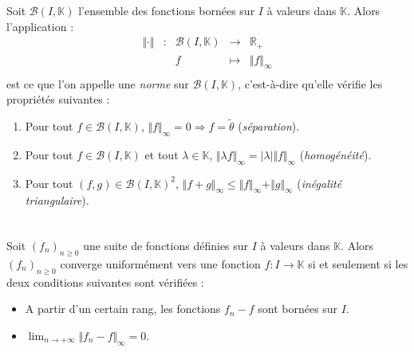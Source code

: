 \documentclass[a4paper,10pt]{report}
\begin{document}
\begin{Theoreme}{} Soit $\mathcal{B}(I,\mathbb{K})$ l'ensemble des fonctions bornées sur $I$ à valeurs dans $\mathbb{K}$. Alors l'application :
$$ \begin{array}{ccccl}
\Vert \cdot \Vert & : & \mathcal{B}(I, \mathbb{K}) & \rightarrow & \mathbb{R}_+ \\
& & f & \mapsto & \Vert f \Vert_{\infty} \\
\end{array}$$
est ce que l'on appelle une \emph{norme} sur $\mathcal{B}(I,\mathbb{K})$, c'est-à-dire qu'elle vérifie les propriétés suivantes : 
\begin{enumerate}
\item Pour tout $f \in \mathcal{B}(I,\mathbb{K})$, $\Vert f \Vert_{\infty} = 0 \Longrightarrow f= \tilde{\theta}$ (\emph{séparation}).
\item Pour tout $f  \in \mathcal{B}(I,\mathbb{K})$ et tout $\lambda \in \mathbb{K}$, $\Vert \lambda f \Vert_{\infty} = \vert \lambda \vert \Vert f \Vert_{\infty}$ (\emph{homogénéité}).
\item Pour tout $(f,g) \in \mathcal{B}(I,\mathbb{K})^2$, $\Vert f+g \Vert_{\infty} \leq \Vert f\Vert_{\infty} + \Vert g \Vert_{\infty}$ (\emph{inégalité triangulaire}).
\end{enumerate}
\end{Theoreme}
\begin{Demonstration}{}

\vspace{10cm}

\newpage

$\phantom{test}$

\vspace{9cm}
\end{Demonstration}

\begin{Proposition}{}  Soit $(f_n)_{n \geq 0}$ une suite de fonctions définies sur $I$ à valeurs dans $\mathbb{K}$. Alors $(f_n)_{n \geq 0}$ converge uniformément vers une fonction $f : I \rightarrow \mathbb{K}$ si et seulement si les deux conditions suivantes sont vérifiées :  

\begin{itemize}
\item A partir d'un certain rang, les fonctions $f_n-f$ sont bornées sur $I$.
\item $\lim_{n \rightarrow + \infty} \Vert f_n - f  \Vert_{\infty} =0$.
\end{itemize}
\end{Proposition}
\end{document}
